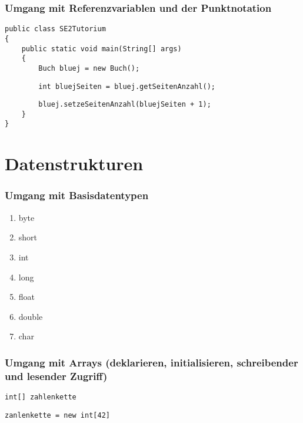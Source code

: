 \documentclass[mathserif]{beamer}
\begin{document}
\begin{frame}[fragile]
\frametitle{Umgang mit Referenzvariablen und der Punktnotation}
    \begin{lstlisting}
public class SE2Tutorium
{
    public static void main(String[] args)
    {
        Buch bluej = new Buch();
    \end{lstlisting}
    \pause
    \begin{lstlisting}
        int bluejSeiten = bluej.getSeitenAnzahl();
    \end{lstlisting}
    \pause
    \begin{lstlisting}
        bluej.setzeSeitenAnzahl(bluejSeiten + 1);
    }
}
    \end{lstlisting}
\end{frame}

\begin{frame}
\end{frame}

\section{Datenstrukturen}

\begin{frame}[fragile]
\frametitle{Umgang mit Basisdatentypen}
    \begin{enumerate}
        \item byte
        \item short
        \item int
        \item long
        \pause
        \item float
        \item double
        \pause
        \item char
    \end{enumerate}
\end{frame}

\begin{frame}[fragile]
\frametitle{Umgang mit Arrays (deklarieren, initialisieren, schreibender und lesender Zugriff)}
\pause
    \begin{lstlisting}
int[] zahlenkette
    \end{lstlisting}
\pause
    \begin{lstlisting}
zanlenkette = new int[42]
    \end{lstlisting}
\end{frame}
\end{document}
